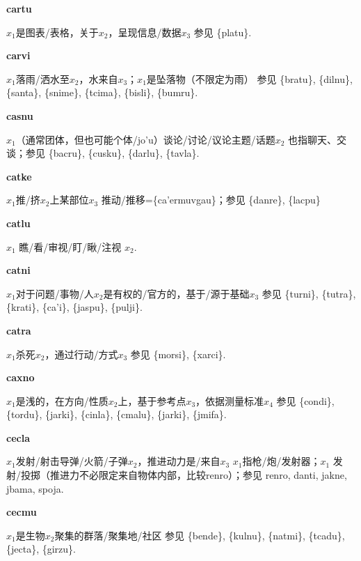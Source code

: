 \documentclass[notitlepage,twocolumn,a4paper,10pt]{book}
\begin{document}
{\sffamily\bfseries cartu}\enspace {\ttfamily\bfseries[cat]}  $x_1$是图表\slash{}表格，关于$x_2$，呈现信息\slash{}数据$x_3$ \textemdash{} 参见 \{platu\}.

{\sffamily\bfseries carvi}\enspace {\ttfamily\bfseries[cav]}  $x_1$落雨\slash{}洒水至$x_2$，水来自$x_3$；$x_1$是坠落物（不限定为雨） \textemdash{} 参见 \{bratu\}, \{dilnu\}, \{santa\}, \{snime\}, \{tcima\}, \{bisli\}, \{bumru\}.

{\sffamily\bfseries casnu}\enspace {\ttfamily\bfseries[    snu]}  $x_1$（通常团体，但也可能个体\slash{}jo'u）谈论\slash{}讨论\slash{}议论主题\slash{}话题$x_2$ \textemdash{} 也指聊天、交谈；参见 \{bacru\}, \{cusku\}, \{darlu\}, \{tavla\}.

{\sffamily\bfseries catke}\enspace {\ttfamily\bfseries[        ca'e]}  $x_1$推\slash{}挤$x_2$上某部位$x_3$ \textemdash{} 推动\slash{}推移=\{ca'ermuvgau\}；参见 \{danre\}, \{lacpu\}

{\sffamily\bfseries catlu}\enspace {\ttfamily\bfseries[    cta]}  $x_1$ 瞧\slash{}看\slash{}审视\slash{}盯\slash{}瞅\slash{}注视 $x_2$.

{\sffamily\bfseries catni}\enspace {\ttfamily\bfseries[        ca'i]}  $x_1$对于问题\slash{}事物\slash{}人$x_2$是有权的\slash{}官方的，基于\slash{}源于基础$x_3$ \textemdash{} 参见 \{turni\}, \{tutra\}, \{krati\}, \{ca'i\}, \{jaspu\}, \{pulji\}.

{\sffamily\bfseries catra} $x_1$杀死$x_2$，通过行动\slash{}方式$x_3$ \textemdash{} 参见 \{morsi\}, \{xarci\}.

{\sffamily\bfseries caxno}\enspace {\ttfamily\bfseries[cax]}  $x_1$是浅的，在方向\slash{}性质$x_2$上，基于参考点$x_3$，依据测量标准$x_4$ \textemdash{} 参见 \{condi\}, \{tordu\}, \{jarki\}, \{cinla\}, \{cmalu\}, \{jarki\}, \{jmifa\}.

{\sffamily\bfseries cecla}\enspace {\ttfamily\bfseries[cel     ce'a]}  $x_1$发射\slash{}射击导弹\slash{}火箭\slash{}子弹$x_2$，推进动力是\slash{}来自$x_3$ \textemdash{} $x_1$指枪\slash{}炮\slash{}发射器；$x_1$ 发射\slash{}投掷（推进力不必限定来自物体内部，比较{renro}）；参见 {renro}, {danti}, {jakne}, {jbama}, {spoja}.

{\sffamily\bfseries cecmu}\enspace {\ttfamily\bfseries[cem     ce'u]}  $x_1$是生物$x_2$聚集的群落\slash{}聚集地\slash{}社区 \textemdash{} 参见 \{bende\}, \{kulnu\}, \{natmi\}, \{tcadu\}, \{jecta\}, \{girzu\}.
\end{document}
